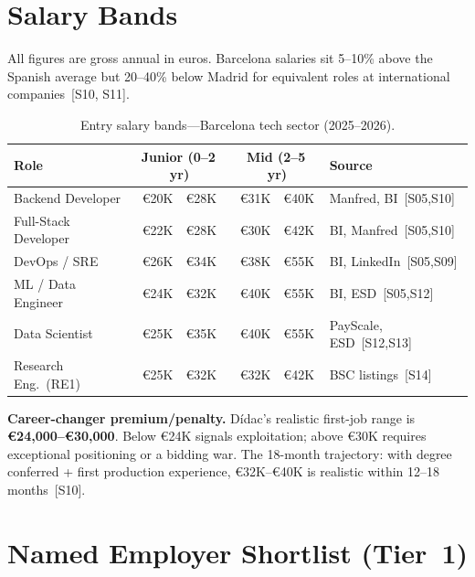 \documentclass[a4paper,11pt,openany]{report}
\begin{document}
\section{Salary Bands}

All figures are gross annual in euros. Barcelona salaries sit 5--10\% above
the Spanish average but 20--40\% below Madrid for equivalent roles at
international companies~[S10, S11].

\begin{table}[htbp]
\centering
\caption{Entry salary bands---Barcelona tech sector (2025--2026).}
\label{tab:salaries}
\begin{tabular}{l r@{--}l r@{--}l l}
\toprule
\textbf{Role} & \multicolumn{2}{c}{\textbf{Junior (0--2\,yr)}} &
  \multicolumn{2}{c}{\textbf{Mid (2--5\,yr)}} & \textbf{Source} \\
\midrule
Backend Developer    & €20K & €28K & €31K & €40K & Manfred, BI~[S05,S10] \\
Full-Stack Developer & €22K & €28K & €30K & €42K & BI, Manfred~[S05,S10] \\
DevOps / SRE         & €26K & €34K & €38K & €55K & BI, LinkedIn~[S05,S09] \\
ML / Data Engineer   & €24K & €32K & €40K & €55K & BI, ESD~[S05,S12] \\
Data Scientist       & €25K & €35K & €40K & €55K & PayScale, ESD~[S12,S13] \\
Research Eng.\ (RE1) & €25K & €32K & €32K & €42K & BSC listings~[S14] \\
\bottomrule
\end{tabular}
\end{table}

\textbf{Career-changer premium/penalty.} Dídac's realistic first-job range is
\textbf{€24,000--€30,000}. Below €24K signals exploitation; above €30K
requires exceptional positioning or a bidding war. The 18-month trajectory:
with degree conferred + first production experience, €32K--€40K is realistic
within 12--18 months~[S10].

\section{Named Employer Shortlist (Tier~1)}
\end{document}
